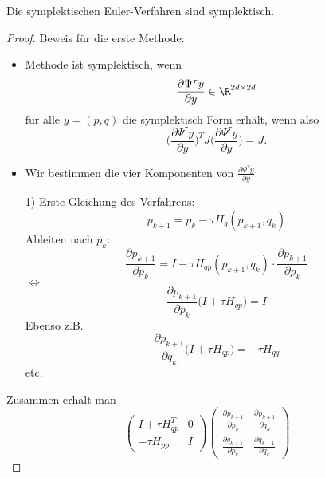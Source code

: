 \begin{satz}
	Die symplektischen Euler-Verfahren sind symplektisch.
\end{satz}
\begin{proof}
	Beweis für die erste Methode:
	\begin{itemize}
		\item Methode ist symplektisch, wenn
		\begin{equation*}
			\frac{\partial\Psi^\tau y}{\partial y}\in \R^{2d\times 2d}
		\end{equation*}
		für alle $y=(p,q)$ die symplektisch Form erhält, wenn also
		\begin{equation}\label{eq:symplektische_form}
			\Big(\frac{\partial\Psi^\tau y}{\partial y}\Big)^TJ\Big(\frac{\partial\Psi^\tau y}{\partial y}\Big) = J.
		\end{equation}
		\item Wir bestimmen die vier Komponenten von $\frac{\partial\Psi^\tau y}{\partial y}$:
		\item [1)] Erste Gleichung des Verfahrens:
			\begin{equation*}
				p_{k+1} = p_k - \tau H_q(p_{k+1},q_k)
			\end{equation*}
			Ableiten nach $p_k$:
			\begin{equation*}
				\frac{\partial p_{k+1}}{\partial p_k} = I - \tau H_{qp}(p_{k+1},q_k)\cdot \frac{\partial p_{k+1}}{\partial p_k}
			\end{equation*}
			$\Leftrightarrow$
			\begin{equation*}
				\frac{\partial p_{k+1}}{\partial p_k}\Big(I + \tau H_{qp}\Big) = I
			\end{equation*}
			Ebenso z.B.
			\begin{equation*}
				\frac{\partial p_{k+1}}{\partial q_k}\Big(I + \tau H_{qp}\Big) = -\tau H_{qq}
			\end{equation*}
			etc.
	\end{itemize}
Zusammen erhält man
\begin{equation*}
	\begin{pmatrix}
		I + \tau H_{qp}^T & 0 \\ -\tau H_{pp} & I
	\end{pmatrix}
	\begin{pmatrix}
		\frac{\partial p_{k+1}}{\partial p_k} & 	\frac{\partial p_{k+1}}{\partial q_k} \\
			\frac{\partial q_{k+1}}{\partial p_k}  & 	\frac{\partial q_{k+1}}{\partial q_k}
	\end{pmatrix}

\end{equation*}
\end{proof}
